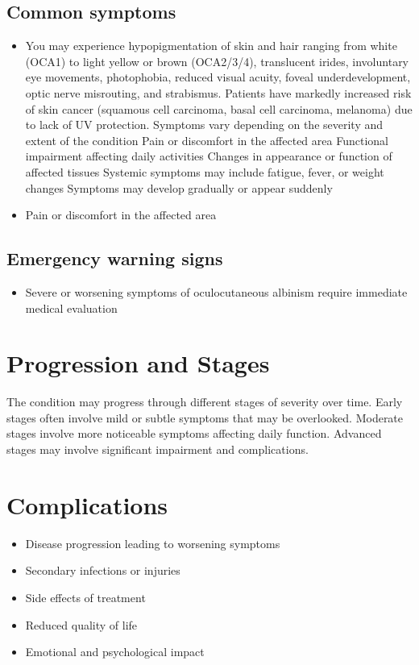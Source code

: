 \subsection{Common symptoms}
\begin{itemize}[noitemsep]
  \item You may experience hypopigmentation of skin and hair ranging from white (OCA1) to light yellow or brown (OCA2/3/4), translucent irides, involuntary eye movements, photophobia, reduced visual acuity, foveal underdevelopment, optic nerve misrouting, and strabismus. Patients have markedly increased risk of skin cancer (squamous cell carcinoma, basal cell carcinoma, melanoma) due to lack of UV protection. Symptoms vary depending on the severity and extent of the condition Pain or discomfort in the affected area Functional impairment affecting daily activities Changes in appearance or function of affected tissues Systemic symptoms may include fatigue, fever, or weight changes Symptoms may develop gradually or appear suddenly
  \item Pain or discomfort in the affected area
  \end{itemize}

\subsection{Emergency warning signs}
\begin{itemize}[noitemsep]
  \item Severe or worsening symptoms of oculocutaneous albinism require immediate medical evaluation
\end{itemize}
\section{Progression and Stages}
The condition may progress through different stages of severity over time. Early stages often involve mild or subtle symptoms that may be overlooked. Moderate stages involve more noticeable symptoms affecting daily function. Advanced stages may involve significant impairment and complications.
\section{Complications}
\begin{itemize}[noitemsep]
  \item Disease progression leading to worsening symptoms
  \item Secondary infections or injuries
  \item Side effects of treatment
  \item Reduced quality of life
  \item Emotional and psychological impact
\end{itemize}
